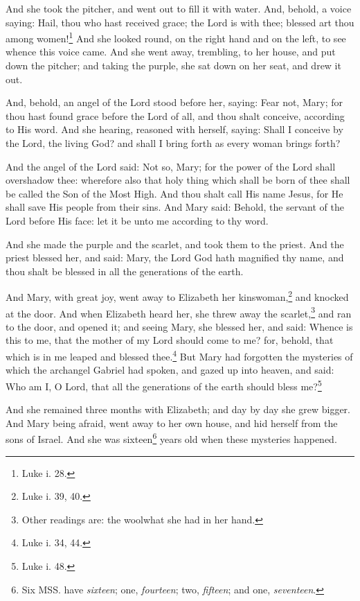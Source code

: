 \pend\pstart
{}

\pend\setcounter{pstartR}{1}\pstart
And she took the pitcher, and went out to fill it with water. And, behold, a voice saying: Hail, thou who hast received grace; the Lord is with thee; blessed art thou among women!\footnote{Luke i. 28.} And she looked round, on the right hand and on the left, to see whence this voice came. And she went away, trembling, to her house, and put down the pitcher; and taking the purple, she sat down on her seat, and drew it out.

\pend\pstart
And, behold, an angel of the Lord stood before her, saying: Fear not, Mary; for thou hast found grace before the Lord of all, and thou shalt conceive, according to His word. And she hearing, reasoned with herself, saying: Shall I conceive by the Lord, the living God? and shall I bring forth as every woman brings forth?

\pend\pstart
And the angel of the Lord said: Not so, Mary; for the power of the Lord shall overshadow thee: wherefore also that holy thing which shall be born of thee shall be called the Son of the Most High. And thou shalt call His name Jesus, for He shall save His people from their sins. And Mary said: Behold, the servant of the Lord before His face: let it be unto me according to thy word.

\pend\pstart
{}

\pend\setcounter{pstartR}{1}\pstart
And she made the purple and the scarlet, and took them to the priest. And the priest blessed her, and said: Mary, the Lord God hath magnified thy name, and thou shalt be blessed in all the generations of the earth.

\pend\pstart
And Mary, with great
joy, went away to Elizabeth her kinswoman,\footnote{Luke i. 39, 40.} and knocked at the door. And when Elizabeth heard her, she threw away the scarlet,\footnote{Other readings are: the wool\textemdash what she had in her hand.} and ran to the door, and opened it; and seeing Mary, she blessed her, and said: Whence is this to me, that the mother of my Lord should come to me? for, behold, that which is in me leaped and blessed thee.\footnote{Luke i. 34, 44.} But Mary had forgotten the mysteries of which the archangel Gabriel had spoken, and gazed up into heaven, and said: Who am I, O Lord, that all the generations of the earth should bless me?\footnote{Luke i. 48.}

\pend\pstart
And she remained three months with Elizabeth; and day by day she grew bigger. And Mary being afraid, went away to her own house, and hid herself from the sons of Israel. And she was sixteen\footnote{Six MSS. have \textit{sixteen}; one, \textit{fourteen}; two, \textit{fifteen}; and one, \textit{seventeen}.} years old when these mysteries happened.


